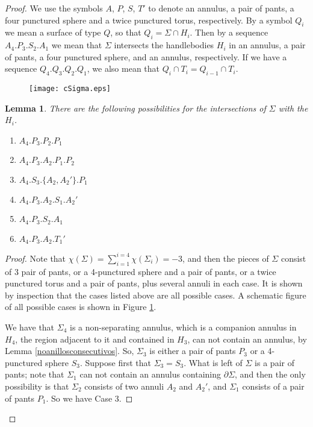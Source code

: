 \documentclass[12pt]{amsart}
\newtheorem{lema}{Lemma}
\begin{document}
\begin{proof}
We use the symbols $A$, $P$, $S$, $T'$ to denote
an annulus, a pair of pants, a four punctured sphere and a twice punctured torus, respectively. By a symbol $Q_i$ we mean a surface of type $Q$, so that $Q_i=\Sigma\cap H_i$. Then by a sequence $A_4.P_3.S_2.A_1$ we mean that $\Sigma$ intersects the handlebodies $H_i$ in an annulus, a pair of pants, a four punctured sphere, and an annulus, respectively. If we have a sequence $Q_4.Q_3.Q_2.Q_1$, we also mean that $Q_i\cap T_i=Q_{i-1}\cap T_{i}$.

\begin{figure}
\begin{center}
\texttt{[image: cSigma.eps]}    
\end{center}
\caption{}
\label{allcases}
\end{figure}

\begin{lema} There are the following possibilities for the intersections of $\Sigma$ with the $H_i$.

\begin{enumerate}
    \item $A_4.P_3.P_2.P_1$
    \item $A_4.P_3.A_2.P_1.P_2$
    \item $A_4.S_3.\{ A_2,A_2'\}.P_1$
    \item $A_4.P_3.A_2.S_1.A_2'$
    \item $A_4.P_3.S_2.A_1$
    \item $A_4.P_3.A_2.T_1'$
    
\end{enumerate}
\end{lema}

\begin{proof} Note that $\chi(\Sigma)=\sum_{i=1}^{i=4} \chi(\Sigma_i)=-3$, and then the pieces of $\Sigma$ consist of 3 pair of pants, or a 4-punctured sphere and a pair of pants, or a twice punctured torus and a pair of pants, plus several annuli in each case. It is shown by inspection that the cases listed above are all possible cases. A schematic figure of all possible cases is shown in Figure \ref{allcases}. 

We have that $\Sigma_4$ is a non-separating annulus, which is a companion annulus in $H_4$, the region adjacent to it and contained in $H_3$, can not contain an annulus, by Lemma \ref{noanillosconsecutivos}. So, $\Sigma_3$ is either a pair of pants $P_3$ or a 4-punctured sphere $S_3$. Suppose first that $\Sigma_3=S_3$. What is left of $\Sigma$ is a pair of pants; note that $\Sigma_1$ can not contain an annulus containing $\partial \Sigma$, and then the only possibility is that $\Sigma_2$ consists of two annuli $A_2$ and $A_2'$, and $\Sigma_1$ consists of a pair of pants $P_1$. So we have Case 3.


\end{proof}
\end{proof}
\end{document}
